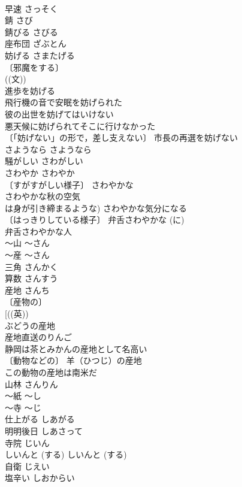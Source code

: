 \documentclass[8pt]{extreport}
\begin{document}
\begin{CJK}{UTF8}{min}
\\	早速	さっそく	
\\	錆	さび	
\\	錆びる	さびる	
\\	座布団	ざぶとん	
\\	妨げる	さまたげる	
\\	〔邪魔をする〕
\\	((文)) 
\\	進歩を妨げる 
\\	飛行機の音で安眠を妨げられた 
\\	彼の出世を妨げてはいけない 
\\	悪天候に妨げられてそこに行けなかった 
\\	〔「妨げない」の形で，差し支えない〕 市長の再選を妨げない 
\\	さようなら	さようなら	
\\	騒がしい	さわがしい	
\\	さわやか	さわやか	
\\	〔すがすがしい様子〕 さわやかな 
\\	さわやかな秋の空気 
\\	は身が引き締まるような) さわやかな気分になる 
\\	〔はっきりしている様子〕 弁舌さわやかな (に) 
\\	弁舌さわやかな人 
\\	～山	～さん	
\\	～産	～さん	
\\	三角	さんかく	
\\	算数	さんすう	
\\	産地	さんち	
\\	〔産物の〕
\\	[((英)) 
\\	ぶどうの産地 
\\	産地直送のりんご 
\\	静岡は茶とみかんの産地として名高い 
\\	〔動物などの〕 羊（ひつじ）の産地 
\\	この動物の産地は南米だ 
\\	山林	さんりん	
\\	～紙	～し	
\\	～寺	～じ	
\\	仕上がる	しあがる	
\\	明明後日	しあさって	
\\	寺院	じいん	
\\	しいんと (する)	しいんと (する)	
\\	自衛	じえい	
\\	塩辛い	しおからい	

\end{CJK}
\end{document}
